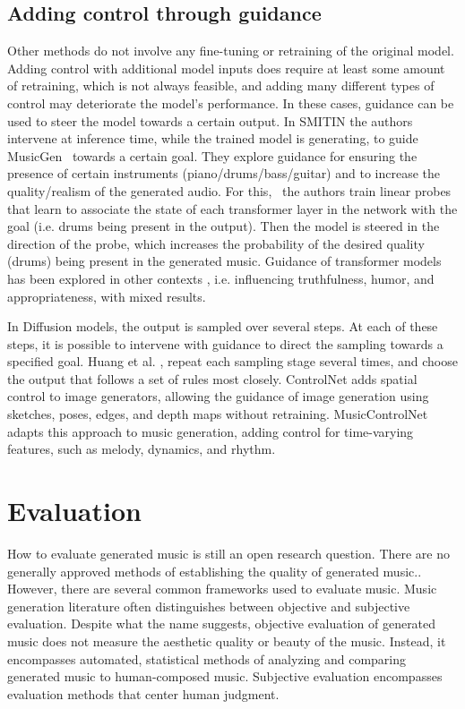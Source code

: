 \subsection{Adding control through guidance}
Other methods do not involve any fine-tuning or retraining of the original model. Adding control with additional model inputs does require at least some amount of retraining, which is not always feasible, and adding many different types of control may deteriorate the model's performance. In these cases, guidance can be used to steer the model towards a certain output.
In SMITIN \cite{Koo_Wichern_Germain_SMITIN_2024} the authors intervene at inference time, while the trained model is generating, to guide MusicGen\cite{copet2023simple}  towards a certain goal. They explore guidance for ensuring the presence of certain instruments (piano/drums/bass/guitar) and to increase the quality/realism of the generated audio. For this,  the authors train linear probes that learn to associate the state of each transformer layer in the network with the goal (i.e. drums being present in the output). Then the model is steered in the direction of the probe, which increases the probability of the desired quality (drums) being present in the generated music. Guidance of transformer models has been explored in other contexts \cite{language_guide_rutte_2024}, i.e. influencing truthfulness, humor, and appropriateness, with mixed results. 

In Diffusion models, the output is sampled over several steps. At each of these steps, it is possible to intervene with guidance to direct the sampling towards a specified goal. Huang et al. \cite{Huang_rule_diffusion_2024}, repeat each sampling stage several times, and choose the output that follows a set of rules most closely. ControlNet \cite{Zhang_Rao_Agrawala_2023} adds spatial control to image generators, allowing the guidance of image generation using sketches, poses, edges, and depth maps without retraining. MusicControlNet \cite{Wu_Donahue_musicontrolnet_2023} adapts this approach to music generation, adding control for time-varying features, such as melody, dynamics, and rhythm. 

\section{Evaluation} \label{section:evaluation}
How to evaluate generated music is still an open research question. There are no generally approved methods of establishing the quality of generated music.\cite{Yin_Reuben_Stepney_Collins_2023}. However, there are several common frameworks used to evaluate music. Music generation literature often distinguishes between objective and subjective evaluation. Despite what the name suggests, objective evaluation of generated music does not measure the aesthetic quality or beauty of the music. Instead, it encompasses automated, statistical methods of analyzing and comparing generated music to human-composed music. Subjective evaluation encompasses evaluation methods that center human judgment. 

